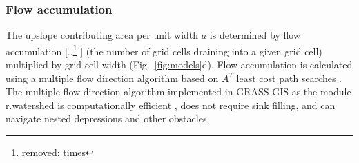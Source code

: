 \documentclass[gmd, manuscript]{copernicus}
\providecommand{\DIFadd}[1]{{\protect\color{blue} \sf #1}} %
\providecommand{\DIFdel}[1]{{\protect\color{red} [..\footnote{removed: #1} ]}} %
\providecommand{\DIFaddbegin}{} %
\providecommand{\DIFaddend}{} %
\providecommand{\DIFdelbegin}{} %
\providecommand{\DIFdelend}{} %
\begin{document}

\DIFaddend %

\subsubsection{Flow accumulation}
%
The upslope contributing area per unit width \DIFaddbegin \DIFadd{$a$
}\DIFaddend is determined by flow accumulation 
\DIFdelbegin \DIFdel{times }\DIFdelend \DIFaddbegin \DIFadd{(the number of grid cells draining into a given grid cell)
multiplied by }\DIFaddend grid cell width (Fig.~\ref{fig:models}d). 
Flow accumulation is calculated using 
a multiple flow direction algorithm \citep{Metz2009} 
based on $A^{T}$ least cost path searches \citep{Ehlschlaeger1989}. 
The multiple flow direction algorithm 
implemented in GRASS GIS as the module r.watershed
is computationally efficient\DIFaddbegin \DIFadd{, does not require sink filling, 
}\DIFaddend and can navigate nested depressions and other obstacles. 

\end{document}

